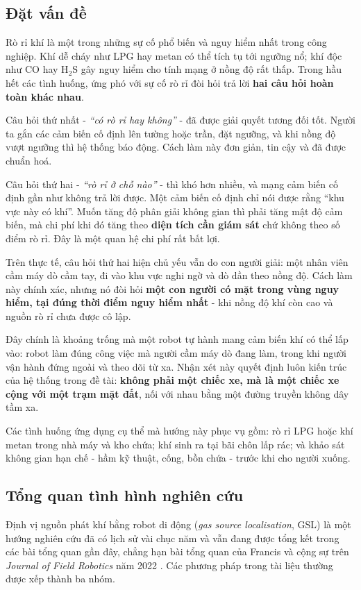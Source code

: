 \subsection{Đặt vấn đề}
Rò rỉ khí là một trong những sự cố phổ biến và nguy hiểm nhất trong công nghiệp. Khí dễ cháy như LPG hay metan có thể tích tụ tới ngưỡng nổ; khí độc như CO hay H$_{2}$S gây nguy hiểm cho tính mạng ở nồng độ rất thấp. Trong hầu hết các tình huống, ứng phó với sự cố rò rỉ đòi hỏi trả lời \textbf{hai câu hỏi hoàn toàn khác nhau}.

Câu hỏi thứ nhất - \textit{``có rò rỉ hay không''} - đã được giải quyết tương đối tốt. Người ta gắn các cảm biến cố định lên tường hoặc trần, đặt ngưỡng, và khi nồng độ vượt ngưỡng thì hệ thống báo động. Cách làm này đơn giản, tin cậy và đã được chuẩn hoá.

Câu hỏi thứ hai - \textit{``rò rỉ ở chỗ nào''} - thì khó hơn nhiều, và mạng cảm biến cố định gần như không trả lời được. Một cảm biến cố định chỉ nói được rằng ``khu vực này có khí''. Muốn tăng độ phân giải không gian thì phải tăng mật độ cảm biến, mà chi phí khi đó tăng theo \textbf{diện tích cần giám sát} chứ không theo số điểm rò rỉ. Đây là một quan hệ chi phí rất bất lợi.

Trên thực tế, câu hỏi thứ hai hiện chủ yếu vẫn do con người giải: một nhân viên cầm máy dò cầm tay, đi vào khu vực nghi ngờ và dò dần theo nồng độ. Cách làm này chính xác, nhưng nó đòi hỏi \textbf{một con người có mặt trong vùng nguy hiểm, tại đúng thời điểm nguy hiểm nhất} - khi nồng độ khí còn cao và nguồn rò rỉ chưa được cô lập.

Đây chính là khoảng trống mà một robot tự hành mang cảm biến khí có thể lấp vào: robot làm đúng công việc mà người cầm máy dò đang làm, trong khi người vận hành đứng ngoài và theo dõi từ xa. Nhận xét này quyết định luôn kiến trúc của hệ thống trong đề tài: \textbf{không phải một chiếc xe, mà là một chiếc xe cộng với một trạm mặt đất}, nối với nhau bằng một đường truyền không dây tầm xa.

Các tình huống ứng dụng cụ thể mà hướng này phục vụ gồm: rò rỉ LPG hoặc khí metan trong nhà máy và kho chứa; khí sinh ra tại bãi chôn lấp rác; và khảo sát không gian hạn chế - hầm kỹ thuật, cống, bồn chứa - trước khi cho người xuống.


\subsection{Tổng quan tình hình nghiên cứu}
Định vị nguồn phát khí bằng robot di động (\textit{gas source localisation}, GSL) là một hướng nghiên cứu đã có lịch sử vài chục năm và vẫn đang được tổng kết trong các bài tổng quan gần đây, chẳng hạn bài tổng quan của Francis và cộng sự trên \textit{Journal of Field Robotics} năm 2022 \cite{r5}. Các phương pháp trong tài liệu thường được xếp thành ba nhóm.

